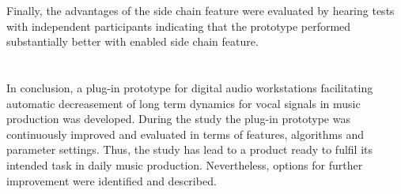 Finally, the advantages of the side chain feature were evaluated by hearing tests with independent participants indicating that the prototype performed substantially better with enabled side chain feature.\\
\\
\\
In conclusion, a plug-in prototype for digital audio workstations facilitating automatic decreasement of long term dynamics for vocal signals in music production was developed. During the study the plug-in prototype was continuously improved and evaluated in terms of features, algorithms and parameter settings. Thus, the study has lead to a product ready to fulfil its intended task in daily music production. Nevertheless, options for further improvement were identified and described.\\



